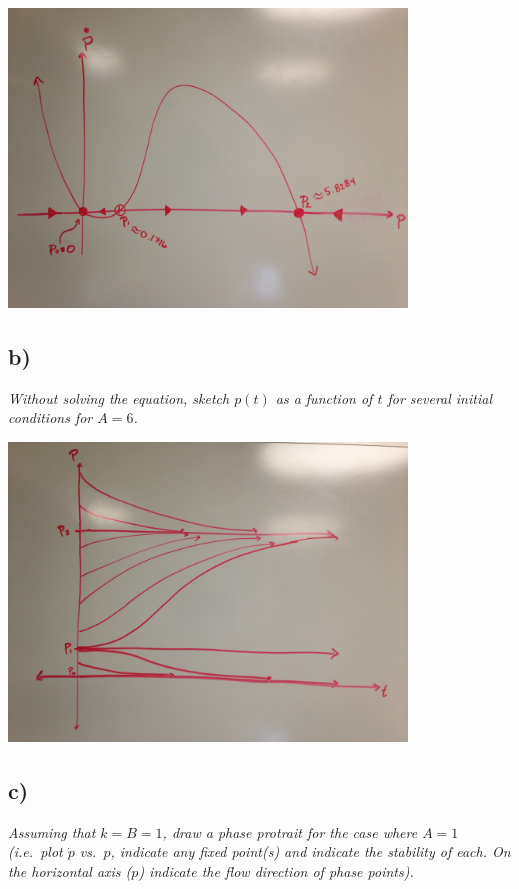 \documentclass[12pt]{article}
\begin{document}
\begin{center}
	\includegraphics[width=400px]{figures/4_a.jpg}
\end{center}

\subsection*{ b)}
{\it Without solving the equation, sketch $p(t)$ as a function of $t$ for several initial conditions for $A = 6$.} 

\begin{center}
	\includegraphics[width=400px]{figures/4_b.jpg}
\end{center}

\subsection*{ c)}
{\it Assuming that $k = B = 1$, draw a phase protrait for the case where $A = 1$ (i.e.~plot $\dot{p}$ vs.~$p$, indicate any fixed point(s) and indicate the stability of each.  On the horizontal axis ($p$) indicate the flow direction of phase points).} 
\end{document}
